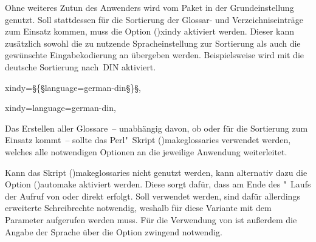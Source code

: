 \documentclass[%
  english,ngerman,%
  cdgeometry=no,DIV=12,%
  cd=false,cdfont=false,cdtitle=true,%
  headings=normal,%
  automark,%
  listof=toc,%
]{tudscrartcl}
\begin{document}
Ohne weiteres Zutun des Anwenders wird vom Paket  in der 
Grundeinstellung  genutzt. Soll stattdessen für die 
Sortierung der Glossar- und Verzeichniseinträge  zum Einsatz 
kommen, muss die Option \Option(){xindy} aktiviert werden.
Dieser kann zusätzlich sowohl die zu nutzende Spracheinstellung zur Sortierung 
als auch die gewünschte Eingabekodierung an  übergeben 
werden. Beispielsweise wird mit 
die deutsche Sortierung nach~DIN aktiviert.
%
\begin{Hint}
  xindy=§\{§language=german-din§\}§, %
\end{Hint}
\begin{Preamble+}
  xindy={language=german-din},
\end{Preamble+}
%
Das Erstellen aller Glossare~-- unabhängig davon, ob  oder 
 für die Sortierung zum Einsatz kommt~-- sollte das 
Perl"~Skript \File(){makeglossaries} verwendet werden, 
welches alle notwendigen Optionen an die jeweilige Anwendung weiterleitet.


Kann das Skript \File(){makeglossaries} nicht genutzt 
werden, kann alternativ dazu die Option \Option(){automake}
aktiviert werden. Diese sorgt dafür, dass am Ende des "~Laufs 
der Aufruf von  oder  direkt erfolgt. 
Soll  verwendet werden, sind dafür allerdings erweiterte 
Schreibrechte notwendig, weshalb für diese Variante  mit dem 
Parameter  aufgerufen werden muss. Für die Verwendung 
von  ist außerdem die Angabe der Sprache über die Option 
 zwingend notwendig. 
\end{document}
